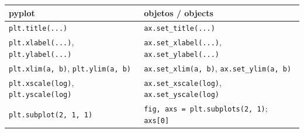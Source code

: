 \begin{table}[h]
\centering
\begin{tabular}{|l|l|}\hline
\textbf{pyplot} & \textbf{objetos / objects}\\ \hline
\texttt{plt.title(\textquotesingle{}...\textquotesingle{})} & \texttt{ax.set\_title(\textquotesingle{}...\textquotesingle{})}\\ \hline
\texttt{plt.xlabel(\textquotesingle{}...\textquotesingle{})}, \texttt{plt.ylabel(\textquotesingle{}...\textquotesingle{})} & \texttt{ax.set\_xlabel(\textquotesingle{}...\textquotesingle{})}, \texttt{ax.set\_ylabel(\textquotesingle{}...\textquotesingle{})}\\ \hline
\texttt{plt.xlim(a, b)}, \texttt{plt.ylim(a, b)} & \texttt{ax.set\_xlim(a, b)}, \texttt{ax.set\_ylim(a, b)}\\ \hline
\texttt{plt.xscale(\textquotesingle{}log\textquotesingle{})}, \texttt{plt.yscale(\textquotesingle{}log\textquotesingle{})} & \texttt{ax.set\_xscale(\textquotesingle{}log\textquotesingle{})}, \texttt{ax.set\_yscale(\textquotesingle{}log\textquotesingle{})}\\ \hline
\texttt{plt.subplot(2, 1, 1)} & \texttt{fig, axs = plt.subplots(2, 1)}; \texttt{axs[0]}\\ \hline
\end{tabular}
\label{tab:pyplot_ax}
\end{table}

